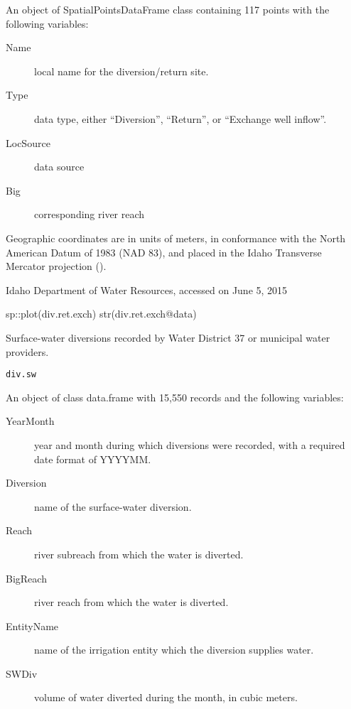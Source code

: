 \documentclass[a4paper]{book}
\begin{document}
\begin{Format}
An object of SpatialPointsDataFrame class containing 117 points with the
following variables:
\begin{description}

\item[Name] local name for the diversion/return site.
\item[Type] data type, either ``Diversion'', ``Return'', or
``Exchange well inflow''.
\item[LocSource] data source
\item[Big] corresponding river reach

\end{description}

Geographic coordinates are in units of meters, in conformance with the
North American Datum of 1983 (NAD 83), and placed in the
Idaho Transverse Mercator projection ().
\end{Format}
%
\begin{Source}\relax
Idaho Department of Water Resources, accessed on June 5, 2015
\end{Source}
%
\begin{Examples}
\begin{ExampleCode}
sp::plot(div.ret.exch)
str(div.ret.exch@data)

\end{ExampleCode}
\end{Examples}
%
\begin{Description}\relax
Surface-water diversions recorded by Water District 37 or municipal water providers.
\end{Description}
%
\begin{Usage}
\begin{verbatim}
div.sw
\end{verbatim}
\end{Usage}
%
\begin{Format}
An object of class data.frame with 15,550 records and the following variables:
\begin{description}

\item[YearMonth] year and month during which diversions were recorded,
with a required date format of YYYYMM.
\item[Diversion] name of the surface-water diversion.
\item[Reach] river subreach from which the water is diverted.
\item[BigReach] river reach from which the water is diverted.
\item[EntityName] name of the irrigation entity which the diversion supplies water.
\item[SWDiv] volume of water diverted during the month, in cubic meters.

\end{description}

\end{Format}
\end{document}
